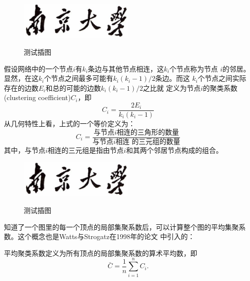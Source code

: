 \documentclass[master]{njuthesis}
\begin{document}
\begin{definition}[局部聚类系数]


\begin{figure}[htbp]
  \centering
  \includegraphics[width= 0.5\textwidth]{njuname.eps}\\
  \caption{测试插图}\label{fig:test5}
\end{figure}

假设网络中的一个节点$i$有$k_i$条边与其他节点相连，这$k_i$个节点称为节点
$i$的邻居。显然，在这$k_i$个节点之间最多可能有$k_i(k_i-1)/2$条边。而这
$k_i$个节点之间实际存在的边数$E_i$和总的可能的边数$k_i(k_i-1)/2$之比就
定义为节点$i$的聚类系数(clustering coefficient)$C_i$，即
\begin{equation}\label{eq:clustering_coefficient}
    C_i = \frac{2E_i}{k_i(k_i-1)}
\end{equation}
从几何特性上看，上式的一个等价定义为：
\begin{equation}\label{eq:clustering_coefficient_triangle}
    C_i = \frac{\text{与节点$i$相连的三角形的数量}}{\text{与节点$i$相连
        的三元组的数量}}
\end{equation}
其中，与节点$i$相连的三元组是指由节点$i$和其两个邻居节点构成的组合。
\end{definition}

\begin{figure}[htbp]
  \centering
  \includegraphics[width= 0.5\textwidth]{njuname.eps}\\
  \caption{测试插图}\label{fig:test6}
\end{figure}

知道了一个图里的每一个顶点的局部集聚系数后，可以计算整个图的平均集聚系
数。这个概念也是Watts与Strogatz在1998年的论文
\cite{watts1998smallworld}中引入的：

\begin{definition}[平均聚类系数]
平均聚类系数定义为所有顶点的局部集聚系数的算术平均数，即
\begin{equation}
    \bar{C} = \frac{1}{n}\sum_{i=1}^{n} C_i.
\end{equation}
\end{definition}
\end{document}
